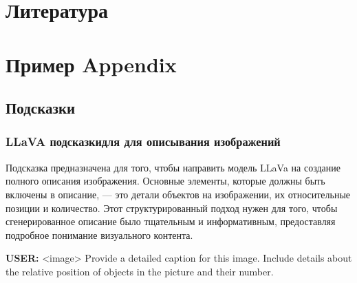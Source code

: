 \documentclass[11pt]{article}
\begin{document}



\clearpage

\section*{Литература}

%


\clearpage

\appendix

\section{Пример Appendix}
\label{sec:appendix}

\subsection{Подсказки}
\subsubsection{LLaVA подсказкидля для описывания изображений}

Подсказка предназначена для того, чтобы направить модель LLaVa на создание полного описания изображения. Основные элементы, которые должны быть включены в описание, — это детали объектов на изображении, их относительные позиции и количество. Этот структурированный подход нужен для того, чтобы сгенерированное описание было тщательным и информативным, предоставляя подробное понимание визуального контента.

\begin{tcolorbox}[
  colback=lightgray, %
  boxrule=1pt, %
]\textbf{USER:} <image> Provide a detailed caption for this image. Include details about the relative position of objects in the picture and their number.  \\
\end{tcolorbox}
\end{document}

